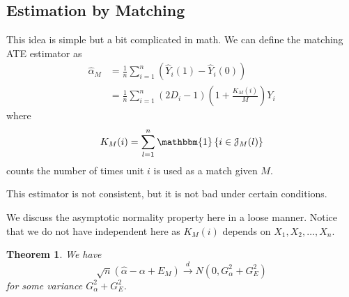 \documentclass[11pt,a4paper]{amsart}
\theoremstyle{plain}
\newtheorem{theorem}{Theorem}
\theoremstyle{definition}
\begin{document}
\subsection{Estimation by Matching}\hfill\par 
	This idea is simple but a bit complicated in math. We can deﬁne the matching ATE estimator as 
	\[	\begin{aligned}
	\widehat{\alpha}_{M} &=\frac{1}{n} \sum_{i=1}^{n}\left(\widehat{Y}_{i}(1)-\widehat{Y}_{i}(0)\right) \\
	&=\frac{1}{n} \sum_{i=1}^{n}\left(2 D_{i}-1\right)\left(1+\frac{K_{M}(i)}{M}\right) Y_{i}
	\end{aligned}	\]
	where
	\[	K_{M}(i)=\sum_{l=1}^{n} \mathbbm{1}\left\{i \in \mathcal{J}_{M}(l)\right\}	\]
	counts the number of times unit $i$ is used as a match given $M$. \par 
	This estimator is not consistent, but it is not bad under certain conditions.\par 
	We discuss the asymptotic normality property here in a loose manner.  Notice that we do not have independent here as $K_{M}(i)$ depends on $X_{1}, X_{2}, \dots, X_{n}$.
	\begin{theorem}
	We have 
	\[		\sqrt{n}(\hat{\alpha} - \alpha + E_{M}) \stackrel{d}{\longrightarrow} N(0,G_{\alpha}^{2} + G_{E}^{2})	\]
	for some variance $G_{\alpha}^{2} + G_{E}^{2}$.
	\end{theorem}
\end{document}
